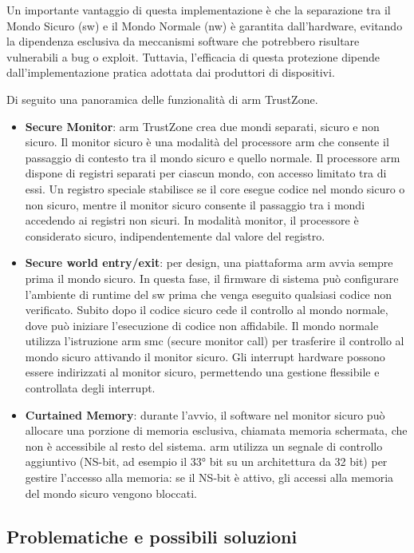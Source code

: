 Un importante vantaggio di questa implementazione è che la separazione tra il Mondo Sicuro (\acrshort{sw}) e il Mondo Normale (\acrshort{nw}) è garantita dall'hardware, evitando la dipendenza esclusiva da meccanismi software che potrebbero risultare vulnerabili a bug o exploit. Tuttavia, l'efficacia di questa protezione dipende dall'implementazione pratica adottata dai produttori di dispositivi.

Di seguito una panoramica delle funzionalità di \acrshort{arm} TrustZone.

\begin{itemize}
    \item \textbf{Secure Monitor}: \acrshort{arm} TrustZone crea due mondi separati, sicuro e non sicuro. Il monitor sicuro è una modalità del processore \acrshort{arm} che consente il passaggio di contesto tra il mondo sicuro e quello normale. Il processore \acrshort{arm} dispone di registri separati per ciascun mondo, con accesso limitato tra di essi. Un registro speciale stabilisce se il core esegue codice nel mondo sicuro o non sicuro, mentre il monitor sicuro consente il passaggio tra i mondi accedendo ai registri non sicuri. In modalità monitor, il processore è considerato sicuro, indipendentemente dal valore del registro.
    \item \textbf{Secure world entry/exit}: per design, una piattaforma \acrshort{arm} avvia sempre prima il mondo sicuro. In questa fase, il firmware di sistema può configurare l'ambiente di runtime del \acrshort{sw} prima che venga eseguito qualsiasi codice non verificato. Subito dopo il codice sicuro cede il controllo al mondo normale, dove può iniziare l'esecuzione di codice non affidabile. Il mondo normale utilizza l'istruzione \acrshort{arm} smc (secure monitor call) per trasferire il controllo al mondo sicuro attivando il monitor sicuro. Gli interrupt hardware possono essere indirizzati al monitor sicuro, permettendo una gestione flessibile e controllata degli interrupt.
    \item \textbf{Curtained Memory}: durante l'avvio, il software nel monitor sicuro può allocare una porzione di memoria esclusiva, chiamata memoria schermata, che non è accessibile al resto del sistema. \acrshort{arm} utilizza un segnale di controllo aggiuntivo (NS-bit, ad esempio il 33° bit su un architettura da 32 bit) per gestire l'accesso alla memoria: se il NS-bit è attivo, gli accessi alla memoria del mondo sicuro vengono bloccati.
\end{itemize}

\subsection{Problematiche e possibili soluzioni}\label{subsec:problematiche_soluzioni}

